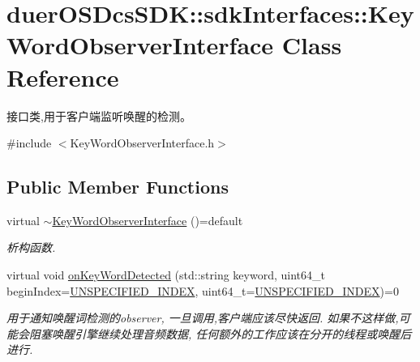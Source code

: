 \hypertarget{classduerOSDcsSDK_1_1sdkInterfaces_1_1KeyWordObserverInterface}{}\section{duer\+O\+S\+Dcs\+S\+DK\+:\+:sdk\+Interfaces\+:\+:Key\+Word\+Observer\+Interface Class Reference}
\label{classduerOSDcsSDK_1_1sdkInterfaces_1_1KeyWordObserverInterface}


接口类,用于客户端监听唤醒的检测。  




{\ttfamily \#include $<$Key\+Word\+Observer\+Interface.\+h$>$}

\subsection*{Public Member Functions}
\begin{DoxyCompactItemize}
\item 
\mbox{\label{classduerOSDcsSDK_1_1sdkInterfaces_1_1KeyWordObserverInterface_a4c45583ddde82010ad7f6399af45feb2}} 
virtual \hyperlink{classduerOSDcsSDK_1_1sdkInterfaces_1_1KeyWordObserverInterface_a4c45583ddde82010ad7f6399af45feb2}{$\sim$\+Key\+Word\+Observer\+Interface} ()=default
\begin{DoxyCompactList}\small\item\em 析构函数. \end{DoxyCompactList}\item 
virtual void \hyperlink{classduerOSDcsSDK_1_1sdkInterfaces_1_1KeyWordObserverInterface_af2a248b56dd4977e02cfdcfffa9047bf}{on\+Key\+Word\+Detected} (std\+::string keyword, uint64\+\_\+t begin\+Index=\hyperlink{classduerOSDcsSDK_1_1sdkInterfaces_1_1KeyWordObserverInterface_a11ee242b3d72866143211ed5526953c1}{U\+N\+S\+P\+E\+C\+I\+F\+I\+E\+D\+\_\+\+I\+N\+D\+EX}, uint64\+\_\+t=\hyperlink{classduerOSDcsSDK_1_1sdkInterfaces_1_1KeyWordObserverInterface_a11ee242b3d72866143211ed5526953c1}{U\+N\+S\+P\+E\+C\+I\+F\+I\+E\+D\+\_\+\+I\+N\+D\+EX})=0
\begin{DoxyCompactList}\small\item\em 用于通知唤醒词检测的observer, 一旦调用,客户端应该尽快返回. 如果不这样做,可能会阻塞唤醒引擎继续处理音频数据, 任何额外的工作应该在分开的线程或唤醒后进行. \end{DoxyCompactList}\end{DoxyCompactItemize}
